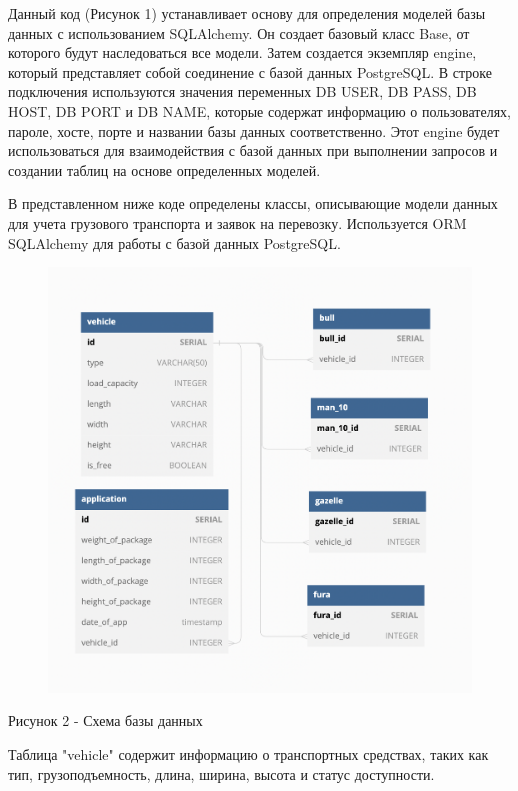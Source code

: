 \documentclass[14pt]{extreport}
\begin{document}
        Данный код (Рисунок 1) устанавливает основу для определения моделей базы данных с использованием SQLAlchemy. Он создает базовый класс Base, от которого будут наследоваться все модели. Затем создается экземпляр engine, который представляет собой соединение с базой данных PostgreSQL. В строке подключения используются значения переменных DB USER, DB PASS, DB HOST, DB PORT и DB NAME, которые содержат информацию о пользователях, пароле, хосте, порте и названии базы данных соответственно. Этот engine будет использоваться для взаимодействия с базой данных при выполнении запросов и создании таблиц на основе определенных моделей.

        В представленном ниже коде определены классы, описывающие модели данных для учета грузового транспорта и заявок на перевозку. Используется ORM SQLAlchemy для работы с базой данных PostgreSQL.

        \begin{figure}[H]
            \centering
            \includegraphics[scale=0.4]{db.png}
        \end{figure}
        \begin{center}
            Рисунок 2 - Схема базы данных
        \end{center}

    Таблица "vehicle" содержит информацию о транспортных средствах, таких как тип, грузоподъемность, длина, ширина, высота и статус доступности.
\end{document}
